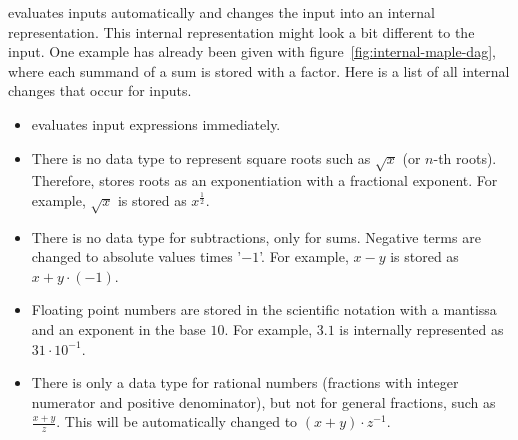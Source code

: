


\Maple{} evaluates inputs automatically and changes the input into an internal representation. This internal representation might look a bit different to the input. One example has already been given with figure~\ref{fig:internal-maple-dag}, where each summand of a sum is stored with a factor. Here is a list of all internal changes that occur for inputs.

\begin{itemize}
\item \Maple{} evaluates input expressions immediately.
\item There is no data type to represent square roots such as $\sqrt{x}$ (or $n$-th roots). Therefore, \Maple{} stores roots as an exponentiation with a fractional exponent. For example, $\sqrt{x}$ is stored as $x^{\frac{1}{2}}$.
\item There is no data type for subtractions, only for sums. Negative terms are changed to absolute values times '$-1$'. For example, $x-y$ is stored as $x + y \cdot (-1)$. 
\item Floating point numbers are stored in the scientific notation with a mantissa and an exponent in the base $10$. For example, $3.1$ is internally represented as $31 \cdot 10^{-1}$.
\item There is only a data type for rational numbers (fractions with integer numerator and positive denominator), but not for general fractions, such as $\frac{x+y}{z}$. This will be automatically changed to $(x+y)\cdot z^{-1}$.
\end{itemize}

